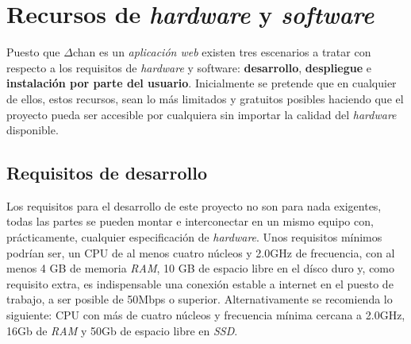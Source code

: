 \documentclass[12pt,a4paper,titlepage]{article}
\newcommand\projectname{$\Delta$chan}
\begin{document}
    \section{Recursos de \textit{hardware} y \textit{software}}




    Puesto que {\projectname} es un \emph{aplicación web} existen tres escenarios a tratar con respecto a los requisitos de \textit{hardware} y software: \textbf{desarrollo}, \textbf{despliegue} e \textbf{instalación por parte del usuario}. Inicialmente se pretende que en cualquier de ellos, estos recursos, sean lo más limitados y gratuitos posibles haciendo que el proyecto pueda ser accesible por cualquiera sin importar la calidad del \textit{hardware} disponible.

    \subsection{Requisitos de desarrollo}

    Los requisitos para el desarrollo de este proyecto no son para nada exigentes, todas las partes se pueden montar e interconectar en un mismo equipo con, prácticamente, cualquier especificación de \textit{hardware}. Unos requisitos mínimos podrían ser, un CPU de al menos cuatro núcleos y 2.0GHz de frecuencia, con al menos 4 GB de memoria \textit{RAM}, 10 GB de espacio libre en el dísco duro y, como requisito extra, es indispensable una conexión estable a internet en el puesto de trabajo, a ser posible de 50Mbps o superior. Alternativamente se recomienda lo siguiente: CPU con más de cuatro núcleos y frecuencia mínima cercana a 2.0GHz, 16Gb de \textit{RAM} y 50Gb de espacio libre en \textit{SSD}.
\end{document}
